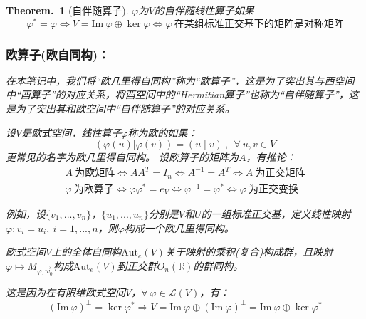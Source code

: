 \documentclass[zihao=-4,UTF8]{report}
\theoremstyle{mystyle} %
\newtheorem{theorem}{Theorem.\,}
\begin{document}
\begin{theorem}[自伴随算子]
    
    $\varphi$为$V$的自伴随线性算子如果
    \begin{equation*}
        \varphi^* = \varphi \Longleftrightarrow V = \text{Im}\ \varphi \oplus \ker \varphi \Longleftrightarrow \varphi\ \text{在某组标准正交基下的矩阵是对称矩阵}    
\end{equation*}
    

\subsubsection{欧算子(欧自同构)：}
{\par\color{gray}\small
在本笔记中，我们将“欧几里得自同构”称为“欧算子”，这是为了突出其与酉空间中“酉算子”的对应关系，将酉空间中的“Hermitian算子”也称为“自伴随算子”，这是为了突出其和欧空间中“自伴随算子”的对应关系。
\par}
设$V$是欧式空间，线性算子$\varphi$称为欧的如果：
\begin{equation*}
    \left(\varphi(u) | \varphi(v)\right) = (u\mid v)\ ,\ \ \forall\ u,v \in V
\end{equation*}
更常见的名字为欧几里得自同构。
设欧算子的矩阵为$A$，有推论：
\begin{gather*}
    A\ \text{为欧矩阵} \Longleftrightarrow AA^T = I_n \Longleftrightarrow A^{-1} = A^T \Longleftrightarrow A \ \text{为正交矩阵}\\
    \varphi\ \text{为欧算子} \Longleftrightarrow \varphi\varphi^* = e_V \Longleftrightarrow \varphi^{-1} = \varphi^*  \Longleftrightarrow \varphi \ \text{为正交变换}
\end{gather*}\par
{\par\color{gray}\small 例如，设$\{v_1,...,v_n\}$，$\{u_1,...,u_n\}$分别是$V$和$U$的一组标准正交基，定义线性映射$\varphi:v_i = u_i,\ i = 1,...,n$，则$\varphi$构成一个欧几里得同构。}\par
{\color{gray}\small 欧式空间$V$上的全体自同构$\text{Aut}_e(V)$关于映射的乘积(复合)构成群，且映射$\varphi \longmapsto M_{\varphi, \vec{w}_0}$构成$\text{Aut}_e(V)$到正交群$O_n(\mathbb{R})$的群同构。}

{\par\color{gray}\small
这是因为在有限维欧式空间$V$，$\forall\ \varphi \in \mathscr{L}(V)$，有：
\begin{equation*}
    (\text{Im}\ \varphi)^{\perp} = \ker \varphi^* \Longrightarrow V = \text{Im}\ \varphi \oplus (\text{Im}\ \varphi)^{\perp}= \text{Im}\ \varphi \oplus \ker \varphi^*
\end{equation*}
\par}
\end{theorem}
\end{document}
